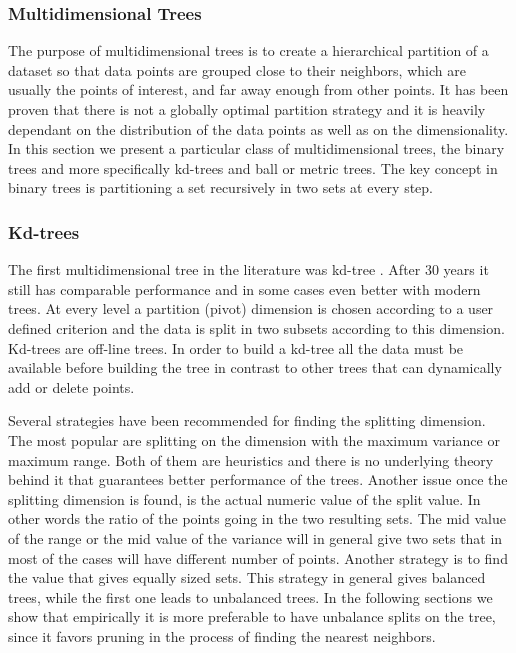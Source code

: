 \documentclass[12pt,letterpaper,doublespaced,ETD,dvips,proposal]{gtthesis}
\begin{document}
\begin{Body}
\subsubsection{Multidimensional Trees}
\label{Multidimensional_Trees}

The purpose of multidimensional trees is to create a hierarchical
partition of a dataset so that data points are grouped close to
their neighbors, which are usually the points of interest, and far
away enough from other points. It has been proven that there is not
a globally optimal partition strategy \cite{gyorfi2002dft} 
and it is heavily dependant on the distribution of the data points 
as well as on the dimensionality. In this section we present a particular
 class of multidimensional
trees, the binary trees and more specifically kd-trees and ball or
metric trees. The key concept in binary trees is partitioning a set
recursively in two sets at every step.

\subsubsection{Kd-trees}
\label{Kd_trees}

The first multidimensional tree in the literature was kd-tree \cite{bentley1975bst}. After
30 years it still has comparable performance and in some cases even
better with modern trees. At every level a partition (pivot)
dimension is chosen according to a user defined criterion and the
data is split in two subsets according to this dimension. Kd-trees
are off-line trees. In order to build a kd-tree all the data must be
available before building the tree in contrast to other trees that
can dynamically add or delete points.

Several strategies have been recommended for finding the splitting
dimension. The most popular are splitting on the dimension with the
maximum variance or maximum range. Both of them are heuristics and
there is no underlying theory behind it that guarantees better
performance of the trees. Another issue once the splitting dimension
is found, is the actual numeric value of the split value. In other words
the ratio of the points going in the two resulting sets. The mid
value of the range or the mid value of the variance will in general
give two sets that in most of the cases will have different number
of points. Another strategy is to find the value that gives equally
sized sets. This strategy in general gives balanced trees, while the
first one leads to unbalanced trees. In the following sections we
show that empirically it is more preferable to have unbalance splits
on the tree, since it favors pruning in the process of finding the
nearest neighbors.


\end{Body}
\end{document}
